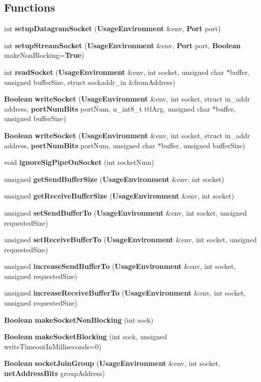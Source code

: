 \subsection*{Functions}
\begin{DoxyCompactItemize}
\item 
int {\bf setup\+Datagram\+Socket} ({\bf Usage\+Environment} \&env, {\bf Port} port)
\item 
int {\bf setup\+Stream\+Socket} ({\bf Usage\+Environment} \&env, {\bf Port} port, {\bf Boolean} make\+Non\+Blocking={\bf True})
\item 
int {\bf read\+Socket} ({\bf Usage\+Environment} \&env, int socket, unsigned char $\ast$buffer, unsigned buffer\+Size, struct sockaddr\+\_\+in \&from\+Address)
\item 
{\bf Boolean} {\bf write\+Socket} ({\bf Usage\+Environment} \&env, int socket, struct in\+\_\+addr address, {\bf port\+Num\+Bits} port\+Num, u\+\_\+int8\+\_\+t ttl\+Arg, unsigned char $\ast$buffer, unsigned buffer\+Size)
\item 
{\bf Boolean} {\bf write\+Socket} ({\bf Usage\+Environment} \&env, int socket, struct in\+\_\+addr address, {\bf port\+Num\+Bits} port\+Num, unsigned char $\ast$buffer, unsigned buffer\+Size)
\item 
void {\bf ignore\+Sig\+Pipe\+On\+Socket} (int socket\+Num)
\item 
unsigned {\bf get\+Send\+Buffer\+Size} ({\bf Usage\+Environment} \&env, int socket)
\item 
unsigned {\bf get\+Receive\+Buffer\+Size} ({\bf Usage\+Environment} \&env, int socket)
\item 
unsigned {\bf set\+Send\+Buffer\+To} ({\bf Usage\+Environment} \&env, int socket, unsigned requested\+Size)
\item 
unsigned {\bf set\+Receive\+Buffer\+To} ({\bf Usage\+Environment} \&env, int socket, unsigned requested\+Size)
\item 
unsigned {\bf increase\+Send\+Buffer\+To} ({\bf Usage\+Environment} \&env, int socket, unsigned requested\+Size)
\item 
unsigned {\bf increase\+Receive\+Buffer\+To} ({\bf Usage\+Environment} \&env, int socket, unsigned requested\+Size)
\item 
{\bf Boolean} {\bf make\+Socket\+Non\+Blocking} (int sock)
\item 
{\bf Boolean} {\bf make\+Socket\+Blocking} (int sock, unsigned write\+Timeout\+In\+Milliseconds=0)
\item 
{\bf Boolean} {\bf socket\+Join\+Group} ({\bf Usage\+Environment} \&env, int socket, {\bf net\+Address\+Bits} group\+Address)

\end{DoxyCompactItemize}
